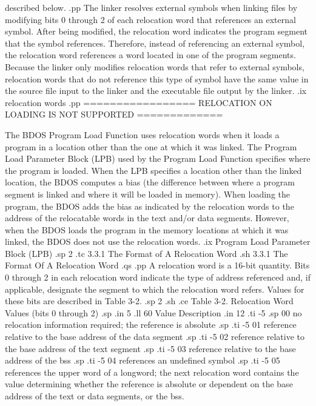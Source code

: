 described below. 
.pp
The linker resolves external symbols when
linking files by modifying bits 0 through 2 of each relocation
word that references an external symbol.
After being modified, the relocation word indicates the program
segment that the symbol references.  Therefore, instead
of referencing an external symbol, the relocation word references
a word located in one of the program segments.  Because the 
linker only modifies relocation words that refer to external
symbols, relocation words that do not reference this type of
symbol have the same value in the source file input to the linker 
and the 
executable file output by the linker.
.ix relocation words
.pp
================= RELOCATION ON LOADING IS NOT SUPPORTED =============

The BDOS Program Load Function uses relocation words when it
loads a program in a location other than the one at which it was
linked.  The Program Load Parameter Block (LPB) used by the
Program Load Function specifies where the program is loaded.  When
the LPB specifies a location other than the linked location, the
BDOS computes a bias (the difference between where a program
segment is linked and where it will be loaded in memory).  When
loading the program, the BDOS adds the bias as indicated by the
relocation words to the address of the relocatable words in the
text and/or data segments.  However, when the BDOS loads the
program in the memory locations at which it was linked, the BDOS
does not use the relocation words. 
.ix Program Load Parameter Block (LPB)
.sp 2
.tc         3.3.1  The Format of A Relocation Word
.sh
3.3.1  The Format Of A Relocation Word
.qs
.pp 
A relocation word is a 16-bit quantity.  Bits 0 through 2 in each
relocation word indicate the type of address referenced and, if
applicable, designate the segment to which the relocation word
refers.  Values for these bits are described in Table 3-2. 
.sp 2
.sh
.ce
Table 3-2.  Relocation Word Values (bits 0 through 2)
.sp
.in 5
.ll 60
Value                     Description
.in 12
.ti -5
.sp 
00   no relocation information required; the reference is absolute
.sp
.ti -5
01   reference relative to the base address of the data segment
.sp
.ti -5
02   reference relative to the base address of the text segment
.sp 
.ti -5
03   reference relative to the base address of the bss 
.sp
.ti -5
04   references an undefined symbol
.sp
.ti -5
05   references the upper word of a longword; the next relocation word 
contains the value determining whether the reference is absolute or 
dependent on the base address of the text or data segments, or the bss.
